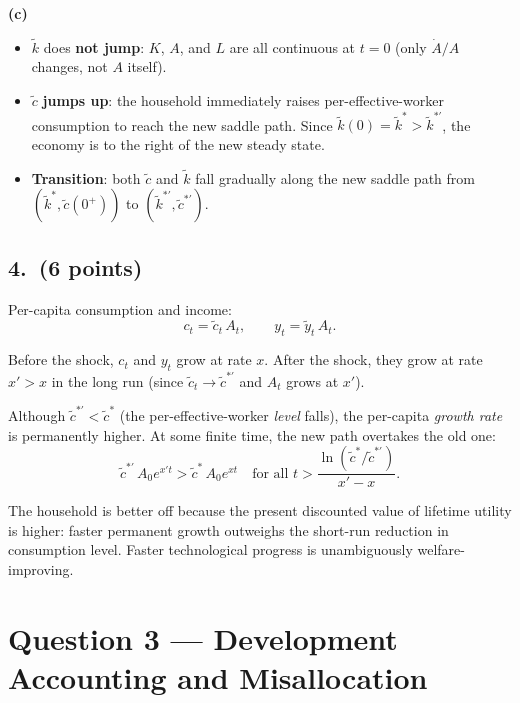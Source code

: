 \documentclass[a4paper,11pt]{article}
\newcommand{\ktilde}{\tilde{k}}
\newcommand{\ytilde}{\tilde{y}}
\newcommand{\ctilde}{\tilde{c}}
\begin{document}
\begin{answerbox}
\textbf{(c)}
\begin{itemize}
    \item $\ktilde$ does \textbf{not jump}: $K$, $A$, and $L$ are all continuous at $t=0$
    (only $\dot{A}/A$ changes, not $A$ itself).
    \item $\ctilde$ \textbf{jumps up}: the household immediately raises per-effective-worker
    consumption to reach the new saddle path.  Since $\ktilde(0) = \ktilde^* > \ktilde^{*\prime}$,
    the economy is to the right of the new steady state.
    \item \textbf{Transition}: both $\ctilde$ and $\ktilde$ fall gradually along the new
    saddle path from $(\ktilde^*, \ctilde(0^+))$ to $(\ktilde^{*\prime}, \ctilde^{*\prime})$.
\end{itemize}
\end{answerbox}

\subsection*{4.\ (6 points)}

\begin{answerbox}
Per-capita consumption and income:
\[
    c_t = \ctilde_t\,A_t, \qquad y_t = \ytilde_t\,A_t.
\]

Before the shock, $c_t$ and $y_t$ grow at rate $x$.  After the shock, they grow at rate
$x' > x$ in the long run (since $\ctilde_t \to \ctilde^{*\prime}$ and $A_t$ grows at $x'$).

Although $\ctilde^{*\prime} < \ctilde^*$ (the per-effective-worker \emph{level} falls),
the per-capita \emph{growth rate} is permanently higher.  At some finite time, the new
path overtakes the old one:
\[
    \ctilde^{*\prime}\,A_0 e^{x' t} > \ctilde^*\,A_0 e^{x t}
    \quad\text{for all } t > \frac{\ln(\ctilde^*/\ctilde^{*\prime})}{x'-x}.
\]

The household is better off because the present discounted value of lifetime utility is
higher: faster permanent growth outweighs the short-run reduction in consumption level.
Faster technological progress is unambiguously welfare-improving.
\end{answerbox}

\clearpage
\section{Question 3 --- Development Accounting and Misallocation}
\end{document}
